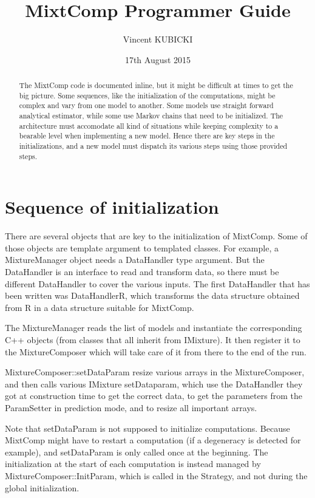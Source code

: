 \documentclass{article}
\title{MixtComp Programmer Guide}
\author{Vincent KUBICKI}
\date{17th August 2015}
\begin{document}
\maketitle
\tableofcontents

\begin{abstract}

The MixtComp code is documented inline, but it might be difficult at times to get the big picture. Some sequences, like the initialization of the computations, might be complex and vary from one model to another. Some models use straight forward analytical estimator, while some use Markov chains that need to be initialized. The architecture must accomodate all kind of situations while keeping complexity to a bearable level when implementing a new model. Hence there are key steps in the initializations, and a new model must dispatch its various steps using those provided steps.

\end{abstract}

\section{Sequence of initialization}

There are several objects that are key to the initialization of MixtComp. Some of those objects are template argument to templated classes. For example, a MixtureManager object needs a DataHandler type argument. But the DataHandler is an interface to read and transform data, so there must be different DataHandler to cover the various inputs. The first DataHandler that has been written was DataHandlerR, which transforms the data structure obtained from R in a data structure suitable for MixtComp.

The MixtureManager reads the list of models and instantiate the corresponding C++ objects (from classes that all inherit from IMixture). It then register it to the MixtureComposer which will take care of it from there to the end of the run.

MixtureComposer::setDataParam resize various arrays in the MixtureComposer, and then calls various IMixture setDataparam, which use the DataHandler they got at construction time to get the correct data, to get the parameters from the ParamSetter in prediction mode, and to resize all important arrays.

Note that setDataParam is not supposed to initialize computations. Because MixtComp might have to restart a computation (if a degeneracy is detected for example), and setDataParam is only called once at the beginning. The initialization at the start of each computation is instead managed by MixtureComposer::InitParam, which is called in the Strategy, and not during the global initialization.
\end{document}

